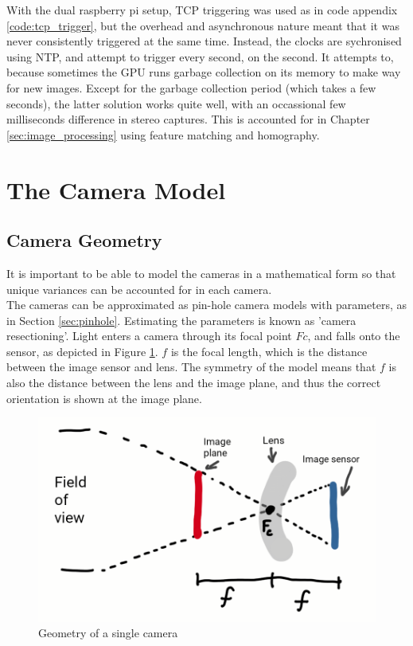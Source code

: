 With the dual raspberry pi setup, TCP triggering was used as in code appendix \ref{code:tcp_trigger}, but the overhead and asynchronous nature meant that it was never consistently triggered at the same time. Instead, the clocks are sychronised using NTP, and attempt to trigger every second, on the second. It attempts to, because sometimes the GPU runs garbage collection on its memory to make way for new images. Except for the garbage collection period (which takes a few seconds), the latter solution works quite well, with an occassional few milliseconds difference in stereo captures. This is accounted for in Chapter \ref{sec:image_processing} using feature matching and homography.

\section{The Camera Model}
\label{sec:cam_model}
\subsection{Camera Geometry}
\label{sec:cam_geometry}

It is important to be able to model the cameras in a mathematical form so that unique variances can be accounted for in each camera.\\

The cameras can be approximated as pin-hole camera models with parameters, as in Section \ref{sec:pinhole}. Estimating the parameters is known as 'camera resectioning'. Light enters a camera through its focal point $Fc$, and falls onto the sensor, as depicted in Figure \ref{fig:camera_geometry}. $f$ is the focal length, which is the distance between the image sensor and lens. The symmetry of the model means that $f$ is also the distance between the lens and the image plane, and thus the correct orientation is shown at the image plane.

\begin{figure}[H]
\centering
\includegraphics[scale=0.35]{images/camera_geometry.png}
\caption{Geometry of a single camera}
\label{fig:camera_geometry}
\end{figure}


